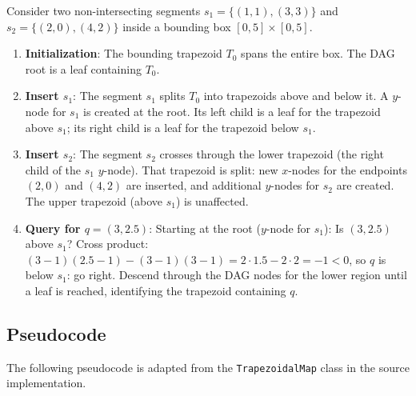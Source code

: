 \begin{example}\label{ex:trapezoidal_map}
Consider two non-intersecting segments $s_1 = \{(1,1),(3,3)\}$ and $s_2 = \{(2,0),(4,2)\}$ inside a bounding box $[0,5] \times [0,5]$.

\begin{enumerate}
\item \textbf{Initialization}: The bounding trapezoid $T_0$ spans the entire box. The DAG root is a leaf containing $T_0$.

\item \textbf{Insert $s_1$}: The segment $s_1$ splits $T_0$ into trapezoids above and below it. A $y$-node for $s_1$ is created at the root. Its left child is a leaf for the trapezoid above $s_1$; its right child is a leaf for the trapezoid below $s_1$.

\item \textbf{Insert $s_2$}: The segment $s_2$ crosses through the lower trapezoid (the right child of the $s_1$ $y$-node). That trapezoid is split: new $x$-nodes for the endpoints $(2,0)$ and $(4,2)$ are inserted, and additional $y$-nodes for $s_2$ are created. The upper trapezoid (above $s_1$) is unaffected.

\item \textbf{Query for $q = (3, 2.5)$}: Starting at the root ($y$-node for $s_1$): Is $(3, 2.5)$ above $s_1$? Cross product: $(3-1)(2.5-1) - (3-1)(3-1) = 2 \cdot 1.5 - 2 \cdot 2 = -1 < 0$, so $q$ is below $s_1$: go right. Descend through the DAG nodes for the lower region until a leaf is reached, identifying the trapezoid containing $q$.
\end{enumerate}
\end{example}

\subsection{Pseudocode}

The following pseudocode is adapted from the \texttt{TrapezoidalMap} class in the source implementation.

